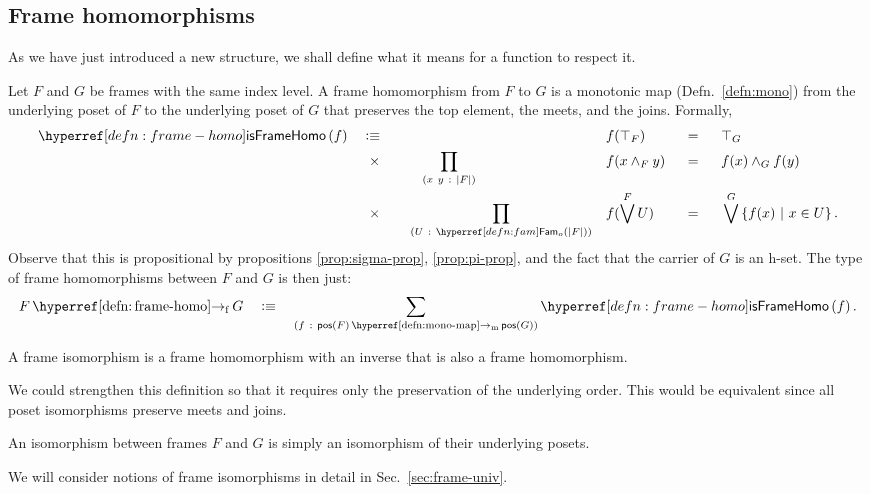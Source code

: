 \subsection{Frame homomorphisms}

As we have just introduced a new structure, we shall define what it means for a function
to respect it.

\begin{defn}\label{defn:frame-homo}
  Let $F$ and $G$ be frames with the same index level. A frame homomorphism from $F$ to
  $G$ is a monotonic map (Defn.~\ref{defn:mono}) from the underlying poset of $F$ to the
  underlying poset of $G$ that preserves the top element, the meets, and the joins.
  Formally,
  \begin{alignat*}{5}
    \isframehomo{f} \quad&\is\quad && &&f(\top_F) &&\idnm{} &&\top_G \\
      &\hspace{0.55em}\times\quad  &&\hspace{0.86em}\pity{x~y}{\abs{F}}{&&f(x \wedge_F y) &&\idnm{} &&f(x) \wedge_G f(y)} \\
      &\hspace{0.55em}\times\quad  &&\pity{U}{\sub{o}{\abs{F}}}{&&f(\bigvee^F U) &&\idnm{} &&\bigvee^G \setof{ f(x) ~|~ x \in U }}.
  \end{alignat*}
  Observe that this is propositional by propositions \ref{prop:sigma-prop},
  \ref{prop:pi-prop}, and the fact that the carrier of $G$ is an h-set. The type of frame
  homomorphisms between $F$ and $G$ is then just:
  \begin{equation*}
    \framehomo{F}{G} \quad\is\quad \sigmaty{f}{\mono{\posof{F}}{\posof{G}}}{\isframehomo{f}}.
  \end{equation*}
\end{defn}

\begin{defn}\label{defn:frame-iso}
  A frame isomorphism is a frame homomorphism with an inverse that is also a frame
  homomorphism.
\end{defn}

We could strengthen this definition so that it requires only the preservation of the
underlying order. This would be equivalent since all poset isomorphisms preserve meets and
joins.
\begin{defn}\label{defn:frame-iso-official}
  An isomorphism between frames $F$ and $G$ is simply an isomorphism of their underlying
  posets.
\end{defn}
We will consider notions of frame isomorphisms in detail in Sec.~\ref{sec:frame-univ}.

